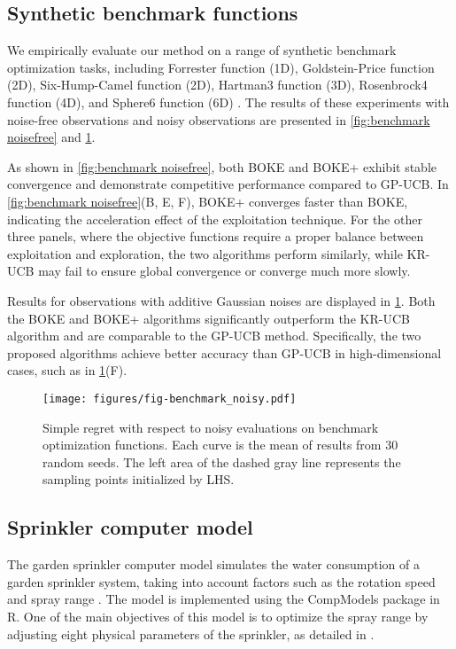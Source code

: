 \documentclass[11pt,en]{elegantpaper}
\newcommand{\1}{\mathds{1}}
\begin{document}
\subsection{Synthetic benchmark functions}

We empirically evaluate our method on a range of synthetic benchmark optimization tasks, including Forrester function (1D), Goldstein-Price function (2D), Six-Hump-Camel function (2D), Hartman3 function (3D), Rosenbrock4 function (4D), and Sphere6 function (6D) \cite{jamil2013literature,picheny2013benchmark}.
The results of these experiments with noise-free observations and noisy observations are presented in \cref{fig:benchmark noisefree} and \cref{fig:benchmark noisy}.


As shown in \cref{fig:benchmark noisefree}, both BOKE and BOKE+ exhibit stable convergence and demonstrate competitive performance compared to GP-UCB. In \cref{fig:benchmark noisefree}(B, E, F), BOKE+ converges faster than BOKE, indicating the acceleration effect of the exploitation technique. For the other three panels, where the objective functions require a proper balance between exploitation and exploration, the two algorithms perform similarly, while KR-UCB may fail to ensure global convergence or converge much more slowly.


Results for observations with additive Gaussian noises are displayed in \cref{fig:benchmark noisy}.
Both the BOKE and BOKE+ algorithms significantly outperform the KR-UCB algorithm and are comparable to the GP-UCB method. Specifically, the two proposed algorithms achieve better accuracy than GP-UCB in high-dimensional cases, such as in \cref{fig:benchmark noisy}(F).

\begin{figure}[!htb]
    \centering
    \texttt{[image: figures/fig-benchmark\_noisy.pdf]}
    \caption{
        Simple regret with respect to noisy evaluations on benchmark optimization functions.
        Each curve is the mean of results from 30 random seeds.
        The left area of the dashed gray line represents the sampling points initialized by LHS.
    }
    \label{fig:benchmark noisy}
\end{figure}




\subsection{Sprinkler computer model}

The garden sprinkler computer model simulates the water consumption of a garden sprinkler system, taking into account factors such as the rotation speed and spray range \cite{siebertz2010statistische}. The model is implemented using the CompModels package in R. One of the main objectives of this model is to optimize the spray range by adjusting eight physical parameters of the sprinkler, as detailed in \cite{pourmohamad2021bayesian}.
\end{document}
